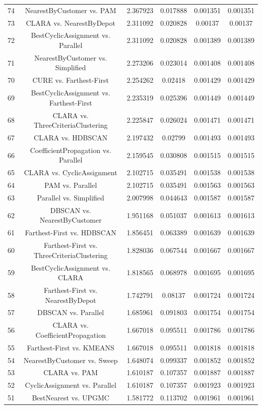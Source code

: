 \documentclass[a4paper,10pt]{article}
\begin{document}
\begin{landscape}
\begin{table}[!htp]
\begin{tabular}{cccccc}
74&NearestByCustomer vs. PAM&2.367923&0.017888&0.001351&0.001351\\
73&CLARA vs. NearestByDepot&2.311092&0.020828&0.00137&0.00137\\
72&BestCyclicAssignment vs. Parallel&2.311092&0.020828&0.001389&0.001389\\
71&NearestByCustomer vs. Simplified&2.273206&0.023014&0.001408&0.001408\\
70&CURE vs. Farthest-First&2.254262&0.02418&0.001429&0.001429\\
69&BestCyclicAssignment vs. Farthest-First&2.235319&0.025396&0.001449&0.001449\\
68&CLARA vs. ThreeCriteriaClustering&2.225847&0.026024&0.001471&0.001471\\
67&CLARA vs. HDBSCAN&2.197432&0.02799&0.001493&0.001493\\
66&CoefficientPropagation vs. Parallel&2.159545&0.030808&0.001515&0.001515\\
65&CLARA vs. CyclicAssignment&2.102715&0.035491&0.001538&0.001538\\
64&PAM vs. Parallel&2.102715&0.035491&0.001563&0.001563\\
63&Parallel vs. Simplified&2.007998&0.044643&0.001587&0.001587\\
62&DBSCAN vs. NearestByCustomer&1.951168&0.051037&0.001613&0.001613\\
61&Farthest-First vs. HDBSCAN&1.856451&0.063389&0.001639&0.001639\\
60&Farthest-First vs. ThreeCriteriaClustering&1.828036&0.067544&0.001667&0.001667\\
59&BestCyclicAssignment vs. CLARA&1.818565&0.068978&0.001695&0.001695\\
58&Farthest-First vs. NearestByDepot&1.742791&0.08137&0.001724&0.001724\\
57&DBSCAN vs. Parallel&1.685961&0.091803&0.001754&0.001754\\
56&CLARA vs. CoefficientPropagation&1.667018&0.095511&0.001786&0.001786\\
55&Farthest-First vs. KMEANS&1.667018&0.095511&0.001818&0.001818\\
54&NearestByCustomer vs. Sweep&1.648074&0.099337&0.001852&0.001852\\
53&CLARA vs. PAM&1.610187&0.107357&0.001887&0.001887\\
52&CyclicAssignment vs. Parallel&1.610187&0.107357&0.001923&0.001923\\
51&BestNearest vs. UPGMC&1.581772&0.113702&0.001961&0.001961\\

\end{tabular}
\end{table}
\end{landscape}
\end{document}
